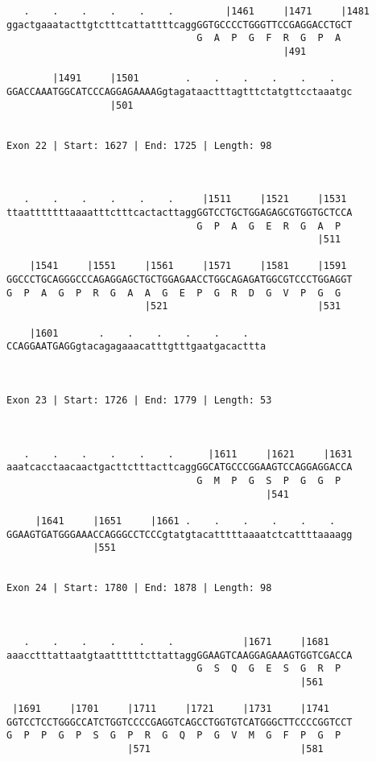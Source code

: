 \documentclass{article}
\begin{document}
\begin{Verbatim}
   .    .    .    .    .    .         |1461     |1471     |1481
ggactgaaatacttgtctttcattattttcaggGGTGCCCCTGGGTTCCGAGGACCTGCT
                                 G  A  P  G  F  R  G  P  A  
                                                |491        
  
        |1491     |1501        .    .    .    .    .    .   
GGACCAAATGGCATCCCAGGAGAAAAGgtagataactttagtttctatgttcctaaatgc
                  |501                                      
  
 
Exon 22 | Start: 1627 | End: 1725 | Length: 98



   .    .    .    .    .    .     |1511     |1521     |1531 
ttaatttttttaaaatttctttcactacttaggGGTCCTGCTGGAGAGCGTGGTGCTCCA
                                 G  P  A  G  E  R  G  A  P  
                                                      |511  
  
    |1541     |1551     |1561     |1571     |1581     |1591 
GGCCCTGCAGGGCCCAGAGGAGCTGCTGGAGAACCTGGCAGAGATGGCGTCCCTGGAGGT
G  P  A  G  P  R  G  A  A  G  E  P  G  R  D  G  V  P  G  G  
                        |521                          |531  
  
    |1601       .    .    .    .    .    .   
CCAGGAATGAGGgtacagagaaacatttgtttgaatgacacttta
                                             
  
 
Exon 23 | Start: 1726 | End: 1779 | Length: 53



   .    .    .    .    .    .      |1611     |1621     |1631
aaatcacctaacaactgacttctttacttcaggGGCATGCCCGGAAGTCCAGGAGGACCA
                                 G  M  P  G  S  P  G  G  P  
                                             |541           
  
     |1641     |1651     |1661 .    .    .    .    .    .   
GGAAGTGATGGGAAACCAGGGCCTCCCgtatgtacatttttaaaatctcattttaaaagg
               |551                                         
  
 
Exon 24 | Start: 1780 | End: 1878 | Length: 98



   .    .    .    .    .    .            |1671     |1681    
aaacctttattaatgtaattttttcttattaggGGAAGTCAAGGAGAAAGTGGTCGACCA
                                 G  S  Q  G  E  S  G  R  P  
                                                   |561     
  
 |1691     |1701     |1711     |1721     |1731     |1741    
GGTCCTCCTGGGCCATCTGGTCCCCGAGGTCAGCCTGGTGTCATGGGCTTCCCCGGTCCT
G  P  P  G  P  S  G  P  R  G  Q  P  G  V  M  G  F  P  G  P  
                     |571                          |581     
  

\end{Verbatim}
\end{document}
